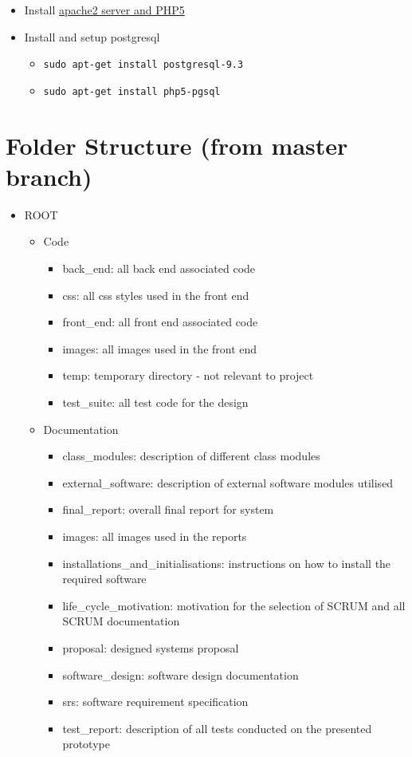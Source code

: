 \documentclass[10pt, a4paper, onecolumn]{scrartcl}
\providecommand{\tightlist}{%
	\setlength{\itemsep}{0pt}\setlength{\parskip}{0pt}}
\begin{document}
	\begin{itemize}
		\tightlist
		\item
		Install
		\href{http://www.howtogeek.com/howto/ubuntu/installing-php5-and-apache-on-ubuntu/}{apache2
			server and PHP5}
		\item
		Install and setup postgresql
		
		\begin{itemize}
			\tightlist
			\item
			\texttt{sudo\ apt-get\ install\ postgresql-9.3}
			\item
			\texttt{sudo\ apt-get\ install\ php5-pgsql}
		\end{itemize}
	\end{itemize}
	
	\section{Folder Structure (from master branch)}
	
	\begin{itemize}
		\item ROOT
		\begin{itemize}
			\item Code
			\begin{itemize}
				\item back\_end: all back end associated code
				\item css: all css styles used in the front end
				\item front\_end: all front end associated code
				\item images: all images used in the front end
				\item temp: temporary directory - not relevant to project
				\item test\_suite: all test code for the design
			\end{itemize}
			\item Documentation
			\begin{itemize}
				\item class\_modules: description of different class modules
				\item external\_software: description of external software modules utilised
				\item final\_report: overall final report for system
				\item images: all images used in the reports
				\item installations\_and\_initialisations: instructions on how to install the required software
				\item life\_cycle\_motivation: motivation for the selection of SCRUM and all SCRUM documentation
				\item proposal: designed systems proposal
				\item software\_design: software design documentation
				\item srs: software requirement specification
				\item test\_report: description of all tests conducted on the presented prototype
			\end{itemize}
		\end{itemize}
	\end{itemize}
	
\end{document}
